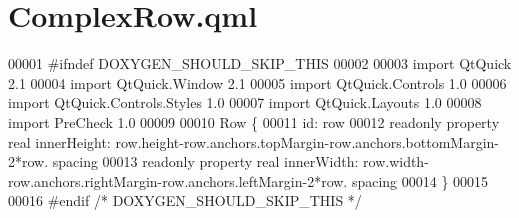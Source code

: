 \hypertarget{ComplexRow_8qml}{\section{Complex\-Row.\-qml}
\label{ComplexRow_8qml}
}

\begin{DoxyCode}
00001 \textcolor{preprocessor}{#ifndef DOXYGEN\_SHOULD\_SKIP\_THIS}
00002 \textcolor{preprocessor}{}
00003 \textcolor{keyword}{import} QtQuick 2.1
00004 import QtQuick.Window 2.1
00005 import QtQuick.Controls 1.0
00006 import QtQuick.Controls.Styles 1.0
00007 import QtQuick.Layouts 1.0
00008 import PreCheck 1.0
00009 
00010 Row \{
00011     \textcolor{keywordtype}{id}: row
00012     readonly \textcolor{keyword}{property} real innerHeight: row.height-row.anchors.topMargin-row.anchors.bottomMargin-2*row.
      spacing
00013     readonly \textcolor{keyword}{property} real innerWidth: row.width-row.anchors.rightMargin-row.anchors.leftMargin-2*row.
      spacing
00014 \}
00015 
00016 \textcolor{preprocessor}{#endif }\textcolor{comment}{/* DOXYGEN\_SHOULD\_SKIP\_THIS */}\textcolor{preprocessor}{}
\end{DoxyCode}
